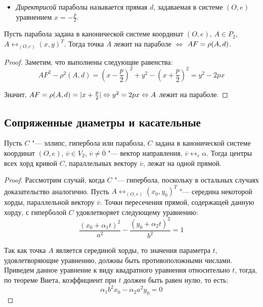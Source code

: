 {\begin{definition}
\begin{itemize}
			\item \textit{Директрисой} параболы называется прямая $d$, задаваемая в системе $(O, e)$ уравнением $x = -\frac{p}{2}$.
		\end{itemize}
	\end{definition}
	
	\begin{theorem}
		Пусть парабола задана в канонической системе координат $(O, e)$, $A \in P_2$, $A \leftrightarrow_{(O, e)} (x, y)^T$. Тогда точка $A$ лежит на параболе $\Leftrightarrow$ $AF \hm{=} \rho(A, d)$.
	\end{theorem}
	
	\begin{proof}
		Заметим, что выполнены следующие равенства:
		\[AF^2 - \rho^2(A, d) = \left(x - \frac{p}{2}\right)^2 + y^2 - \left(x + \frac{p}{2}\right)^2 = y^2 - 2px\]
		
		Значит, $AF = \rho(A, d) = |x + \frac{p}{2}| \Leftrightarrow y^2 = 2px \Leftrightarrow A$ лежит на параболе.
	\end{proof}
	
	\subsection{Сопряженные диаметры и касательные}
	
	\begin{theorem}
		Пусть $C$ "--- эллипс, гипербола или парабола, $C$ задана в канонической системе координат $(O, e)$, $\overline{v} \in V_2$, $\overline{v} \ne \overline 0$ "--- вектор направления, $\overline{v} \leftrightarrow_{e} \alpha$. Тогда центры всех хорд кривой $C$, параллельных вектору $\overline{v}$, лежат на одной прямой.
	\end{theorem}
	
	\begin{proof}
		Рассмотрим случай, когда $C$ "--- гипербола, поскольку в остальных случаях доказательство аналогично. Пусть $A \leftrightarrow_{(O, e)} (x_0, y_0)^T$ "--- середина некоторой хорды, параллельной вектору $\overline{v}$. Точки пересечения прямой, содержащей данную хорду, с гиперболой $C$ удовлетворяет следующему уравнению:
		\[\frac{(x_0 + \alpha_1 t)^2}{a^2} - \frac{(y_0 + \alpha_2 t)^2}{b^2} = 1\]
		
		Так как точка $A$ является серединой хорды, то значения параметра $t$, удовлетворяющие уравнению, должны быть противоположными числами. Приведем данное уравнение к виду квадратного уравнения относительно $t$, тогда, по теореме Виета, коэффициент при $t$ должен быть равен нулю, то есть:
		\[\alpha_1 b^2 x_0 - \alpha_2 a^2 y_0 = 0\]
		

\end{proof}}
